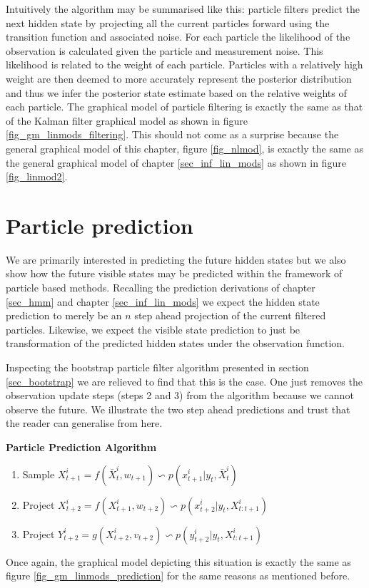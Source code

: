 Intuitively the algorithm may be summarised like this: particle filters predict the next hidden state by projecting all the current particles forward using the transition function and associated noise. For each particle the likelihood of the observation is calculated given the particle and measurement noise. This likelihood is related to the weight of each particle. Particles with a relatively high weight are then deemed to more accurately represent the posterior distribution and thus we infer the posterior state estimate based on the relative weights of each particle. The graphical model of particle filtering is exactly the same as that of the Kalman filter graphical model as shown in figure \ref{fig_gm_linmods_filtering}. This should not come as a surprise because the general graphical model of this chapter, figure \ref{fig_nlmod}, is exactly the same as the general graphical model of chapter \ref{sec_inf_lin_mods} as shown in figure \ref{fig_linmod2}. 

\section{Particle prediction}
\label{sec_particle_prediction}
We are primarily interested in predicting the future hidden states but we also show how the future visible states may be predicted within the framework of particle based methods. Recalling the prediction derivations of chapter \ref{sec_hmm} and chapter \ref{sec_inf_lin_mods} we expect the hidden state prediction to merely be an $n$ step ahead projection of the current filtered particles. Likewise, we expect the visible state prediction to just be transformation of the predicted hidden states under the observation function. 

Inspecting the bootstrap particle filter algorithm presented in section \ref{sec_bootstrap} we are relieved to find that this is the case. One just removes the observation update steps (steps 2 and 3) from the algorithm because we cannot observe the future. We illustrate the two step ahead predictions and trust that the reader can generalise from here.

\textbf{Particle Prediction Algorithm}
\begin{enumerate}
\item
Sample $X_{t+1}^i = f(\bar{X}_t^i, w_{t+1}) \backsim p(x_{t+1}^i|y_t, \bar{X}_t^i)$ 
\item
Project $X_{t+2}^i = f(X_{t+1}^i, w_{t+2}) \backsim p(x_{t+2}^i|y_t, X_{t:t+1}^i)$ 
\item
Project $Y_{t+2}^i = g(X_{t+2}^i, v_{t+2}) \backsim p(y_{t+2}^i|y_t, X_{t:t+1}^i)$ 
\end{enumerate}
Once again, the graphical model depicting this situation is exactly the same as figure \ref{fig_gm_linmods_prediction} for the same reasons as mentioned before.


